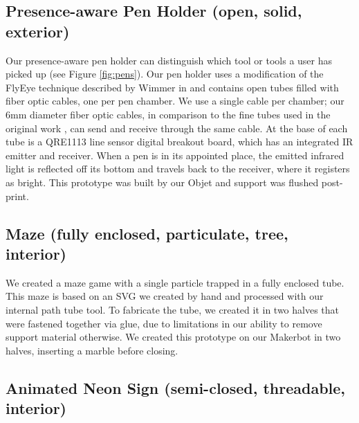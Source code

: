 \subsection{Presence-aware Pen Holder (open, solid, exterior)}


Our presence-aware pen holder can distinguish which tool or tools a user has picked up (see Figure \ref{fig:pens}).  Our pen holder uses a modification of the FlyEye technique described by Wimmer in \cite{Wimmer-flyeye} and contains open tubes filled with fiber optic cables, one per pen chamber.  We use a single cable per chamber; our 6mm diameter fiber optic cables, in comparison to the fine tubes used in the original work , can send and receive through the same cable.  At the base of each tube is a QRE1113 line sensor digital breakout board, which has an integrated IR emitter and receiver.   When a pen is in its appointed place, the emitted infrared light is reflected off its bottom and travels back to the receiver, where it registers as bright.  This prototype was built by our Objet and support was flushed post-print. 

\subsection{Maze (fully enclosed, particulate, tree, interior)}


We created a maze game with a single particle trapped in a fully enclosed tube.  This maze is based on an SVG we created by hand and processed with our internal path tube tool.  To fabricate the tube, we created it in two halves that were fastened together via glue, due to limitations in our ability to remove support material otherwise.   We created this prototype on our Makerbot in two halves, inserting a marble before closing.

\subsection{Animated Neon Sign (semi-closed, threadable, interior)}

